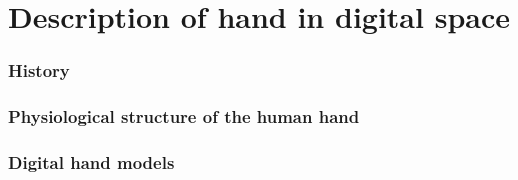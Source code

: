 \chapter{Description of hand in digital space}
\subsection{History}
\subsection{Physiological structure of the human hand}
\subsection{Digital hand models}

